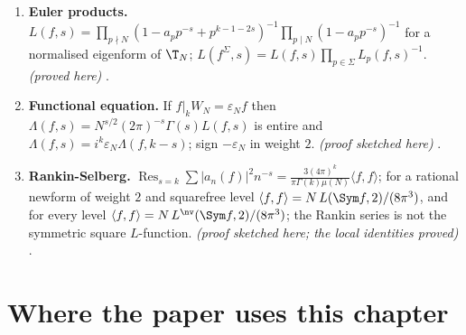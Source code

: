 \begin{enumerate}[label=\textbf{\thechapter.\arabic*}]
divides the positive generator of $\eta^{\mathrm{Hecke}}(g^S)$, as integers, so $v_\ell(r_E)\le v_\ell(\eta^{\mathrm{Hecke}}(g^S))$ for every prime $\ell$. With Step 1 of the paper's proof of
Theorem thm:quant this is an equality under that theorem's hypotheses, with no condition on $S_f$. \emph{(proved here, given the twist lemmas of ; the equality
given Step 1, )} .
\item \textbf{Euler products.} $L(f,s)=\prod_{p\nmid N}(1-a_pp^{-s}+p^{k-1-2s})^{-1}\prod_{p\mid N}(1-a_pp^{-s})^{-1}$ for a normalised eigenform of $\T_N$; $L(f^\Sigma,s)=L(f,s)\prod_{p\in\Sigma}L_p(f,s)^{-1}$.
\emph{(proved here)} .
\item \textbf{Functional equation.} If $f|_kW_N=\varepsilon_Nf$ then $\Lambda(f,s)=N^{s/2}(2\pi)^{-s}\Gamma(s)L(f,s)$ is entire and $\Lambda(f,s)=i^k\varepsilon_N\Lambda(f,k-s)$; sign $-\varepsilon_N$ in
weight $2$. \emph{(proof sketched here)} .
\item \textbf{Rankin-Selberg.} $\operatorname{Res}_{s=k}\sum|a_n(f)|^2n^{-s}=\frac{3(4\pi)^k}{\pi\Gamma(k)\mu(N)}\langle f,f\rangle$; for a rational newform of weight $2$ and squarefree level
$\langle f,f\rangle=N\,L(\Sym f,2)/(8\pi^3)$, and for every level $\langle f,f\rangle=N\,L^{\nv}(\Sym f,2)/(8\pi^3)$; the Rankin series is not the symmetric square $L$-function. \emph{(proof sketched here; the local identities proved)}
.
\end{enumerate}

\section*{Where the paper uses this chapter}


